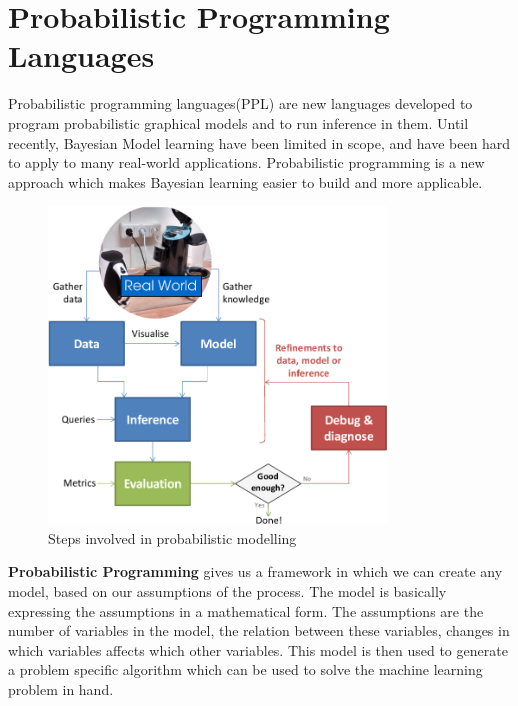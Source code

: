 

\section{Probabilistic Programming Languages}

Probabilistic programming languages(PPL) are new languages developed to program probabilistic graphical models and to run inference in them. 
Until recently, Bayesian Model learning have been limited in scope, and have been hard to apply to many real-world applications. Probabilistic programming is a new approach which makes Bayesian learning easier to build and more applicable. 


\begin{figure}[htp]
\centering
\includegraphics[width=0.8\textwidth]{pictures/Lifecycle.png}
\caption[Steps involved in probabilistic modelling ]{Steps involved in probabilistic modelling  \protect\footnotemark }
\label{}
\end{figure}

\textbf{Probabilistic Programming} gives us a framework in which we can create any model, based on our assumptions of the process. The model is basically expressing the assumptions in a mathematical form. The assumptions are the number of variables in the model, the relation between these variables, changes in which variables affects which other variables. This model is then used to generate a problem specific algorithm which can be used to solve the machine learning problem in hand. 

